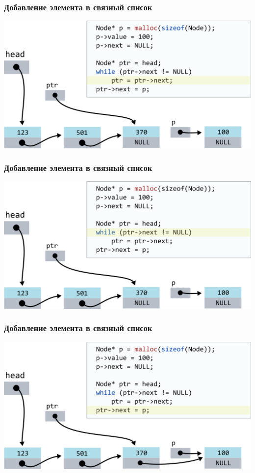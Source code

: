 \documentclass[10pt,pdf,hyperref={unicode}]{beamer}
\begin{document}
\begin{frame}[fragile]
\frametitle{Добавление элемента в связный список}
\begin{center}
\includegraphics[scale=0.6]{images/list/codelistf_insert9.png}
\end{center}
\end{frame}


\begin{frame}[fragile]
\frametitle{Добавление элемента в связный список}
\begin{center}
\includegraphics[scale=0.6]{images/list/codelistf_insert10.png}
\end{center}
\end{frame}

\begin{frame}[fragile]
\frametitle{Добавление элемента в связный список}
\begin{center}
\includegraphics[scale=0.6]{images/list/codelistf_insert11.png}
\end{center}
\end{frame}
\end{document}
